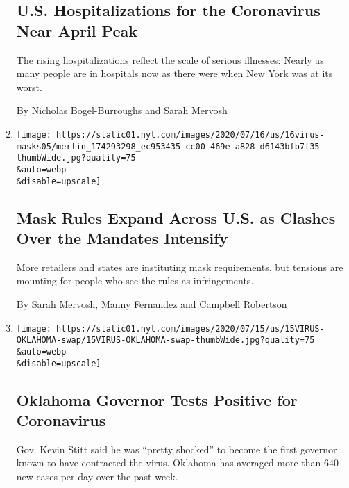 \begin{enumerate}
  \hypertarget{us-hospitalizations-for-the-coronavirus-near-april-peak}{%
  \subsection{U.S. Hospitalizations for the Coronavirus Near April
  Peak}\label{us-hospitalizations-for-the-coronavirus-near-april-peak}}

  The rising hospitalizations reflect the scale of serious illnesses:
  Nearly as many people are in hospitals now as there were when New York
  was at its worst.

  By Nicholas Bogel-Burroughs and Sarah Mervosh
\item
  \href{/2020/07/16/us/coronavirus-masks.html}{}

  \texttt{[image: https://static01.nyt.com/images/2020/07/16/us/16virus-masks05/merlin\_174293298\_ec953435-cc00-469e-a828-d6143bfb7f35-thumbWide.jpg?quality=75\\\&auto=webp\\\&disable=upscale]}

  \hypertarget{mask-rules-expand-across-us-as-clashes-over-the-mandates-intensify}{%
  \subsection{Mask Rules Expand Across U.S. as Clashes Over the Mandates
  Intensify}\label{mask-rules-expand-across-us-as-clashes-over-the-mandates-intensify}}

  More retailers and states are instituting mask requirements, but
  tensions are mounting for people who see the rules as infringements.

  By Sarah Mervosh, Manny Fernandez and Campbell Robertson
\item
  \href{/2020/07/15/us/oklahoma-governor-coronavirus-stitt.html}{}

  \texttt{[image: https://static01.nyt.com/images/2020/07/15/us/15VIRUS-OKLAHOMA-swap/15VIRUS-OKLAHOMA-swap-thumbWide.jpg?quality=75\\\&auto=webp\\\&disable=upscale]}

  \hypertarget{oklahoma-governor-tests-positive-for-coronavirus}{%
  \subsection{Oklahoma Governor Tests Positive for
  Coronavirus}\label{oklahoma-governor-tests-positive-for-coronavirus}}

  Gov. Kevin Stitt said he was ``pretty shocked'' to become the first
  governor known to have contracted the virus. Oklahoma has averaged
  more than 640 new cases per day over the past week.


\end{enumerate}
